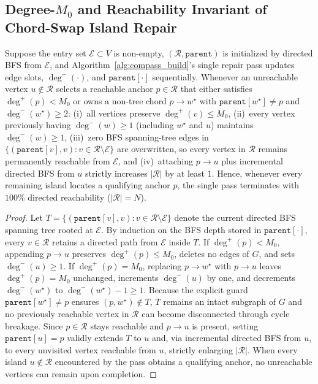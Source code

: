 \subsection{Degree-$M_0$ and Reachability Invariant of Chord-Swap Island Repair}
\begin{proposition}
\label{prop:chord_swap_invariant}
Suppose the entry set $\mathcal{E} \subset V$ is non-empty, $(\mathcal{R}, \texttt{parent})$ is initialized by directed {BFS} from $\mathcal{E}$, and Algorithm~\ref{alg:compass_build}'s single repair pass updates edge slots, $\deg^-(\cdot)$, and $\texttt{parent}[\cdot]$ sequentially.
Whenever an unreachable vertex $u \notin \mathcal{R}$ selects a reachable anchor $p \in \mathcal{R}$ that either satisfies $\deg^+(p) < M_0$ or owns a non-tree chord $p \to w^\star$ with $\texttt{parent}[w^\star] \ne p$ and $\deg^-(w^\star) \ge 2$:
(i)~all vertices preserve $\deg^+(v) \le M_0$,
(ii)~every vertex previously having $\deg^-(w) \ge 1$ (including $w^\star$ and $u$) maintains $\deg^-(w) \ge 1$,
(iii)~zero {BFS} spanning-tree edges in $\{(\texttt{parent}[v], v) : v \in \mathcal{R} \setminus \mathcal{E}\}$ are overwritten, so every vertex in $\mathcal{R}$ remains permanently reachable from $\mathcal{E}$, and
(iv)~attaching $p \to u$ plus incremental directed {BFS} from $u$ strictly increases $|\mathcal{R}|$ by at least $1$.
Hence, whenever every remaining island locates a qualifying anchor $p$, the single pass terminates with $100\%$ directed reachability ($|\mathcal{R}| = N$).
\end{proposition}
\begin{proof}
Let $T = \{(\texttt{parent}[v], v) : v \in \mathcal{R} \setminus \mathcal{E}\}$ denote the current directed {BFS} spanning tree rooted at $\mathcal{E}$.
By induction on the {BFS} depth stored in $\texttt{parent}[\cdot]$, every $v \in \mathcal{R}$ retains a directed path from $\mathcal{E}$ inside $T$.
If $\deg^+(p) < M_0$, appending $p \to u$ preserves $\deg^+(p) \le M_0$, deletes no edges of $G$, and sets $\deg^-(u) \ge 1$.
If $\deg^+(p) = M_0$, replacing $p \to w^\star$ with $p \to u$ leaves $\deg^+(p) = M_0$ unchanged, increments $\deg^-(u)$ by one, and decrements $\deg^-(w^\star)$ to $\deg^-(w^\star) - 1 \ge 1$.
Because the explicit guard $\texttt{parent}[w^\star] \ne p$ ensures $(p, w^\star) \notin T$, $T$ remains an intact subgraph of $G$ and no previously reachable vertex in $\mathcal{R}$ can become disconnected through cycle breakage.
Since $p \in \mathcal{R}$ stays reachable and $p \to u$ is present, setting $\texttt{parent}[u] = p$ validly extends $T$ to $u$ and, via incremental directed {BFS} from $u$, to every unvisited vertex reachable from $u$, strictly enlarging $|\mathcal{R}|$.
When every island $u \notin \mathcal{R}$ encountered by the pass obtains a qualifying anchor, no unreachable vertices can remain upon completion.
\end{proof}


